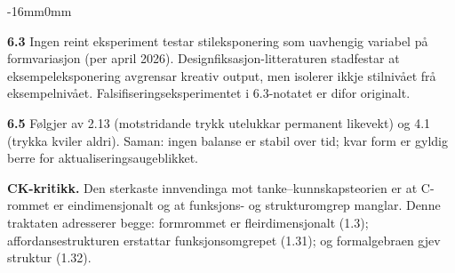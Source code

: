 \documentclass[10pt,oneside]{book}
\newenvironment{widebody}{%
  \begin{adjustwidth}{-16mm}{0mm}%
}{%
  \end{adjustwidth}%
}
\begin{document}
\begin{widebody}
{\textbf{6.3} Ingen reint eksperiment testar stileksponering som uavhengig variabel på formvariasjon (per april 2026). Designfiksasjon-litteraturen stadfestar at eksempeleksponering avgrensar kreativ output, men isolerer ikkje stilnivået frå eksempelnivået. Falsifiseringseksperimentet i 6.3-notatet er difor originalt.

\textbf{6.5} Følgjer av 2.13 (motstridande trykk utelukkar permanent likevekt) og 4.1 (trykka kviler aldri). Saman: ingen balanse er stabil over tid; kvar form er gyldig berre for aktualiseringsaugeblikket.

\textbf{CK-kritikk.} Den sterkaste innvendinga mot tanke--kunnskapsteorien er at C-rommet er eindimensjonalt og at funksjons- og strukturomgrep manglar. Denne traktaten adresserer begge: formrommet er fleirdimensjonalt (1.3); affordansestrukturen erstattar funksjonsomgrepet (1.31); og formalgebraen gjev struktur (1.32).

}
\end{widebody}
\end{document}
